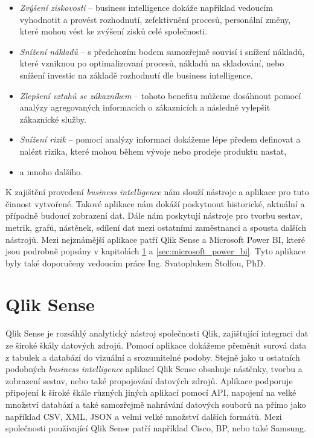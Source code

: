 \documentclass[czech,master]{diploma}
\begin{document}
\begin{itemize}
\item \textit{Zvýšení ziskovosti} -- business intelligence dokáže například vedoucím vyhodnotit a provést rozhodnutí, zefektivnění procesů, personální změny, které mohou vést ke zvýšení zisků celé společnosti.
\item \textit{Snížení nákladů} -- s předchozím bodem samozřejmě souvisí i snížení nákladů, které vzniknou po optimalizovaní procesů, nákladů na skladování, nebo snížení investic na základě rozhodnutí dle business intelligence.
\item \textit{Zlepšení vztahů se zákazníkem} -- tohoto benefitu můžeme dosáhnout pomocí analýzy agregovaných informacích o zákaznicích a následně vylepšit zákaznické služby.
\item \textit{Snížení rizik} -- pomocí analýzy informací dokážeme lépe předem definovat a nalézt rizika, které mohou během vývoje nebo prodeje produktu nastat,
\item a mnoho dalšího.
\end{itemize}

K zajištění provedení \textit{business intelligence} nám slouží nástroje a aplikace pro tuto činnost vytvořené. Takové aplikace nám dokáží poskytnout historické, aktuální a případně budoucí zobrazení dat. Dále nám poskytují nástroje pro tvorbu sestav, metrik, grafů, nástěnek, sdílení dat mezi ostatními zaměstnanci a spousta dalších nástrojů. Mezi nejznámější aplikace patří Qlik Sense a Microsoft Power BI, které jsou podrobně popsány v kapitolách \ref{sec:qlik} a \ref{sec:microsoft_power_bi}. Tyto aplikace byly také doporučeny vedoucím práce Ing. Svatoplukem Štolfou, PhD.

\section{Qlik Sense}
\label{sec:qlik}
Qlik Sense je rozsáhlý analytický nástroj společnosti Qlik, zajišťující integraci dat ze široké škály datových zdrojů. Pomocí aplikace dokážeme přeměnit surová data z tabulek a databází do vizuální a srozumitelné podoby. Stejně jako u ostatních podobných \textit{business intelligence} aplikací Qlik Sense obsahuje nástěnky, tvorbu a zobrazení sestav, nebo také propojování datových zdrojů. Aplikace podporuje připojení k široké škále různých jiných aplikací pomocí API, napojení na velké množství databází a také samozřejmě nahrávání datových souborů na přímo jako například CSV, XML, JSON a velmi velké množství dalších formátů. Mezi společnosti používající Qlik Sense patří například Cisco, BP, nebo také Samsung. \cite{ref:qlik_general}
\end{document}
